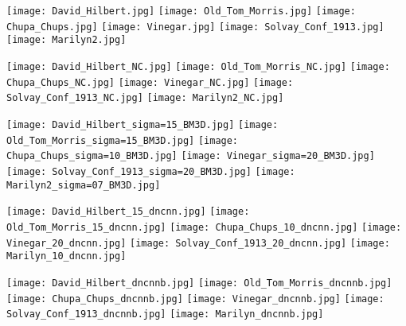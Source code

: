 \documentclass[journal]{IEEEtran}
\begin{document}
\begin{figure*}[!htbp]\setcounter{subfigure}{-30}
\begin{center}
\subfigure
{\texttt{[image: David\_Hilbert.jpg]}}
\subfigure
{\texttt{[image: Old\_Tom\_Morris.jpg]}}
\subfigure
{\texttt{[image: Chupa\_Chups.jpg]}}
\subfigure
{\texttt{[image: Vinegar.jpg]}}
\subfigure
{\texttt{[image: Solvay\_Conf\_1913.jpg]}}
\subfigure
{\texttt{[image: Marilyn2.jpg]}}

\subfigure
{\texttt{[image: David\_Hilbert\_NC.jpg]}}
\subfigure
{\texttt{[image: Old\_Tom\_Morris\_NC.jpg]}}
\subfigure
{\texttt{[image: Chupa\_Chups\_NC.jpg]}}
\subfigure
{\texttt{[image: Vinegar\_NC.jpg]}}
\subfigure
{\texttt{[image: Solvay\_Conf\_1913\_NC.jpg]}}
\subfigure
{\texttt{[image: Marilyn2\_NC.jpg]}}

\subfigure
{\texttt{[image: David\_Hilbert\_sigma=15\_BM3D.jpg]}}
\subfigure
{\texttt{[image: Old\_Tom\_Morris\_sigma=15\_BM3D.jpg]}}
\subfigure
{\texttt{[image: Chupa\_Chups\_sigma=10\_BM3D.jpg]}}
\subfigure
{\texttt{[image: Vinegar\_sigma=20\_BM3D.jpg]}}
\subfigure
{\texttt{[image: Solvay\_Conf\_1913\_sigma=20\_BM3D.jpg]}}
\subfigure
{\texttt{[image: Marilyn2\_sigma=07\_BM3D.jpg]}}


\subfigure
{\texttt{[image: David\_Hilbert\_15\_dncnn.jpg]}}
\subfigure
{\texttt{[image: Old\_Tom\_Morris\_15\_dncnn.jpg]}}
\subfigure
{\texttt{[image: Chupa\_Chups\_10\_dncnn.jpg]}}
\subfigure
{\texttt{[image: Vinegar\_20\_dncnn.jpg]}}
\subfigure
{\texttt{[image: Solvay\_Conf\_1913\_20\_dncnn.jpg]}}
\subfigure
{\texttt{[image: Marilyn\_10\_dncnn.jpg]}}


\subfigure
{\texttt{[image: David\_Hilbert\_dncnnb.jpg]}}
\subfigure
{\texttt{[image: Old\_Tom\_Morris\_dncnnb.jpg]}}
\subfigure
{\texttt{[image: Chupa\_Chups\_dncnnb.jpg]}}
\subfigure
{\texttt{[image: Vinegar\_dncnnb.jpg]}}
\subfigure
{\texttt{[image: Solvay\_Conf\_1913\_dncnnb.jpg]}}
\subfigure
{\texttt{[image: Marilyn\_dncnnb.jpg]}}



\end{center}
\end{figure*}
\end{document}
